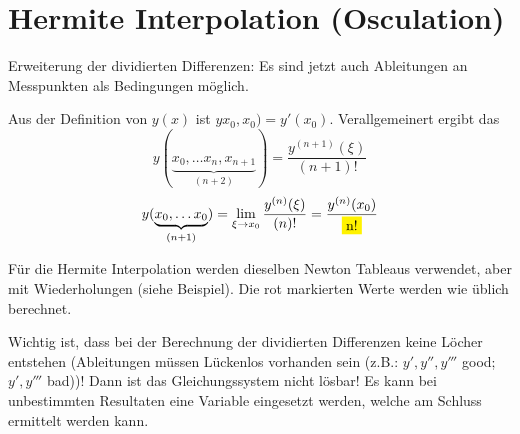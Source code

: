 \section{Hermite Interpolation (Osculation)}
Erweiterung der dividierten Differenzen: Es sind jetzt auch Ableitungen an Messpunkten als 
Bedingungen möglich.

Aus der Definition von $y(x)$ ist $yx_0,x_0) = y'(x_0)$. Verallgemeinert ergibt das
\[y(\underbrace{x_0, \ldots x_n, x_{n+1}}_{(n+2)}) = \frac{y^{(n+1)}(\xi)}{(n+1)!}\]
\[y(\underbrace{x_0, \ldots x_0}_{(n+1)}) = \lim_{\xi \rightarrow x_0} \frac{y^{(n)}(\xi)}{(n)!} = \frac{y^{(n)}(x_0)}{\hilight{n!}}\]

Für die Hermite Interpolation werden dieselben Newton Tableaus verwendet, aber mit Wiederholungen (siehe Beispiel).
Die rot markierten Werte werden wie üblich berechnet.

Wichtig ist, dass bei der Berechnung der dividierten Differenzen keine Löcher entstehen (Ableitungen müssen Lückenlos vorhanden sein (z.B.: $y',y'',y'''$ good; $y',y'''$ bad))! Dann ist das 
Gleichungssystem nicht lösbar! Es kann bei unbestimmten Resultaten eine Variable eingesetzt werden,
welche am Schluss ermittelt werden kann.

